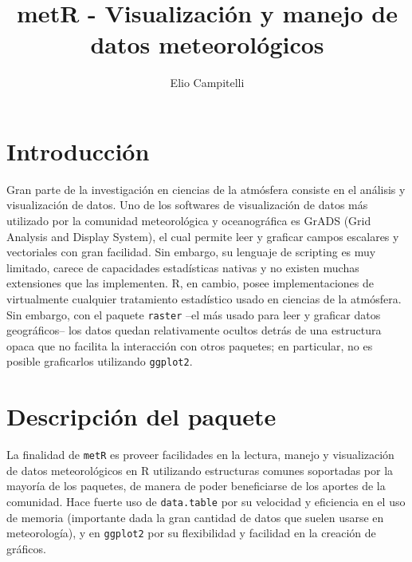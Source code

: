 \documentclass[runningheads,13pt]{llncs}\usepackage{knitr}
\begin{document}
\title{metR - Visualización y manejo de datos meteorológicos}

%
\author{Elio Campitelli}

%
%
%
\maketitle              %





\section{Introducción}

Gran parte de la investigación en ciencias de la atmósfera consiste en el análisis y visualización de datos. Uno de los softwares de visualización de datos más utilizado por la comunidad meteorológica y oceanográfica es GrADS (Grid Analysis and Display System), el cual permite leer y graficar campos escalares y vectoriales con gran facilidad. Sin embargo, su lenguaje de scripting es muy limitado, carece de capacidades estadísticas nativas y no existen muchas extensiones que las implementen. R, en cambio, posee implementaciones de virtualmente cualquier tratamiento estadístico usado en ciencias de la atmósfera. Sin embargo, con el paquete \texttt{raster}\cite{R-raster} --el más usado para leer y graficar datos geográficos-- los datos quedan relativamente ocultos detrás de una estructura opaca que no facilita la interacción con otros paquetes; en particular, no es posible graficarlos utilizando \texttt{ggplot2}\cite{R-ggplot2}. 

\section{Descripción del paquete}

La finalidad de \texttt{metR}\cite{R-metR} es proveer facilidades en la lectura, manejo y visualización de datos meteorológicos en R utilizando estructuras comunes soportadas por la mayoría de los paquetes, de manera de poder beneficiarse de los aportes de la comunidad. Hace fuerte uso de \texttt{data.table}\cite{R-data.table} por su velocidad y eficiencia en el uso de memoria (importante dada la gran cantidad de datos que suelen usarse en meteorología), y en \texttt{ggplot2} por su flexibilidad y facilidad en la creación de gráficos. 
\end{document}
